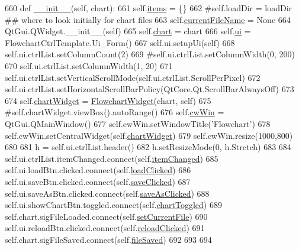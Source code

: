 \begin{DoxyCode}
660     \textcolor{keyword}{def }\hyperlink{classFlowchart_1_1FlowchartCtrlWidget_add87f8852015b0f5ea759e4b190c07f6}{\_\_init\_\_}(self, chart):
661         self.\hyperlink{classFlowchart_1_1FlowchartCtrlWidget_a2b2cce03df58e42726668ccbea738d16}{items} = \{\}
662         \textcolor{comment}{#self.loadDir = loadDir  ## where to look initially for chart files}
663         self.\hyperlink{classFlowchart_1_1FlowchartCtrlWidget_ad00c939c1c39f4803560ba5e9e0933a2}{currentFileName} = \textcolor{keywordtype}{None}
664         QtGui.QWidget.\_\_init\_\_(self)
665         self.\hyperlink{classFlowchart_1_1FlowchartCtrlWidget_a78d9548db343b8db6cf06ebd0ea8e2f4}{chart} = chart
666         self.\hyperlink{classFlowchart_1_1FlowchartCtrlWidget_a2f16540e34be423bf6c5633d28cce2b2}{ui} = FlowchartCtrlTemplate.Ui\_Form()
667         self.ui.setupUi(self)
668         self.ui.ctrlList.setColumnCount(2)
669         \textcolor{comment}{#self.ui.ctrlList.setColumnWidth(0, 200)}
670         self.ui.ctrlList.setColumnWidth(1, 20)
671         self.ui.ctrlList.setVerticalScrollMode(self.ui.ctrlList.ScrollPerPixel)
672         self.ui.ctrlList.setHorizontalScrollBarPolicy(QtCore.Qt.ScrollBarAlwaysOff)
673         
674         self.\hyperlink{classFlowchart_1_1FlowchartCtrlWidget_adb097ecb8f7ef517b9f699309d0962a4}{chartWidget} = \hyperlink{classFlowchart_1_1FlowchartWidget}{FlowchartWidget}(chart, self)
675         \textcolor{comment}{#self.chartWidget.viewBox().autoRange()}
676         self.\hyperlink{classFlowchart_1_1FlowchartCtrlWidget_a10c44d866b65330f80b248d4dc546be2}{cwWin} = QtGui.QMainWindow()
677         self.cwWin.setWindowTitle(\textcolor{stringliteral}{'Flowchart'})
678         self.cwWin.setCentralWidget(self.\hyperlink{classFlowchart_1_1FlowchartCtrlWidget_adb097ecb8f7ef517b9f699309d0962a4}{chartWidget})
679         self.cwWin.resize(1000,800)
680         
681         h = self.ui.ctrlList.header()
682         h.setResizeMode(0, h.Stretch)
683         
684         self.ui.ctrlList.itemChanged.connect(self.\hyperlink{classFlowchart_1_1FlowchartCtrlWidget_a2f6bcc49acd98b685b63fb50f8c22a82}{itemChanged})
685         self.ui.loadBtn.clicked.connect(self.\hyperlink{classFlowchart_1_1FlowchartCtrlWidget_ac7baaa8f68f752e8f2f6805749ead72c}{loadClicked})
686         self.ui.saveBtn.clicked.connect(self.\hyperlink{classFlowchart_1_1FlowchartCtrlWidget_a07e6e27deb706dea32ad2d6a6b7b002c}{saveClicked})
687         self.ui.saveAsBtn.clicked.connect(self.\hyperlink{classFlowchart_1_1FlowchartCtrlWidget_a8338b019613756e8fa08b784c62ca5a8}{saveAsClicked})
688         self.ui.showChartBtn.toggled.connect(self.\hyperlink{classFlowchart_1_1FlowchartCtrlWidget_aa6b271ab2a94eae72b87cc212d86915d}{chartToggled})
689         self.chart.sigFileLoaded.connect(self.\hyperlink{classFlowchart_1_1FlowchartCtrlWidget_ae9167bea0d4227887017a8e349434800}{setCurrentFile})
690         self.ui.reloadBtn.clicked.connect(self.\hyperlink{classFlowchart_1_1FlowchartCtrlWidget_a73b43b50243f4f4b48a57bd4fdc211f1}{reloadClicked})
691         self.chart.sigFileSaved.connect(self.\hyperlink{classFlowchart_1_1FlowchartCtrlWidget_ad3fd41da6933186b7b12f52c612671c0}{fileSaved})
692         
693     
694         
\end{DoxyCode}


